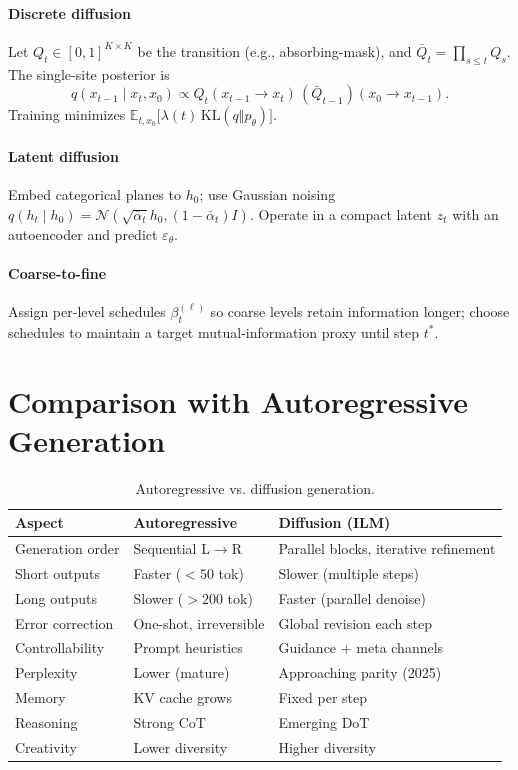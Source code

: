 \documentclass[11pt]{article}
\begin{document}
\paragraph{Discrete diffusion}
Let $Q_t\in[0,1]^{K\times K}$ be the transition (e.g., absorbing-mask), and $\bar{Q}_t{=}\prod_{s\le t}Q_s$. The single-site posterior is
\begin{equation}
  q(x_{t-1}\mid x_t,x_0) \propto Q_t(x_{t-1}\to x_t)\,(\bar{Q}_{t-1})(x_0\to x_{t-1}).
\end{equation}
Training minimizes $\mathbb{E}_{t,x_0}\big[\lambda(t)\,\mathrm{KL}(q\Vert p_\theta)\big]$.

\paragraph{Latent diffusion}
Embed categorical planes to $h_0$; use Gaussian noising $q(h_t\mid h_0){=}\mathcal{N}(\sqrt{\bar{\alpha}_t}h_0,(1{-}\bar{\alpha}_t)I)$. Operate in a compact latent $z_t$ with an autoencoder and predict $\varepsilon_\theta$.

\paragraph{Coarse-to-fine}
Assign per-level schedules $\beta_t^{(\ell)}$ so coarse levels retain information longer; choose schedules to maintain a target mutual-information proxy until step $t^*$.

\section{Comparison with Autoregressive Generation}
\begin{table}[h]
  \centering
  \renewcommand{\arraystretch}{1.15}
  \begin{tabularx}{\linewidth}{@{} l XX @{} }
    \toprule
    Aspect & Autoregressive & Diffusion (ILM) \\
    \midrule
    Generation order & Sequential L$\to$R & Parallel blocks, iterative refinement \\
    Short outputs & Faster ($<50$ tok) & Slower (multiple steps) \\
    Long outputs & Slower ($>200$ tok) & Faster (parallel denoise) \\
    Error correction & One-shot, irreversible & Global revision each step \\
    Controllability & Prompt heuristics & Guidance + meta channels \\
    Perplexity & Lower (mature) & Approaching parity (2025) \\
    Memory & KV cache grows & Fixed per step \\
    Reasoning & Strong CoT & Emerging DoT \\
    Creativity & Lower diversity & Higher diversity \\
    \bottomrule
  \end{tabularx}
  \vspace{-6pt}
  \caption{Autoregressive vs. diffusion generation.}
\end{table}
\end{document}
